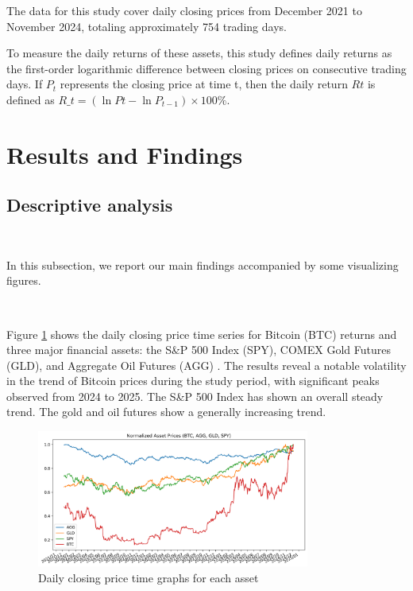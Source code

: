 \documentclass{article}
\begin{document}
The data for this study cover daily closing prices from December 2021 to November 2024, totaling approximately 754 trading days.



To measure the daily returns of these assets, this study defines daily returns as the first-order logarithmic difference between closing prices on consecutive trading days. If $P_t$  represents the closing price at time t, then the daily return $Rt$ is defined as $R\_t = (\ln Pt - \ln P_{t-1}) \times 100\%$. 

\section{Results and Findings}




\subsection{Descriptive analysis}
\

In this subsection, we report our main findings accompanied by some visualizing figures.

\

Figure \ref{prince} shows the daily closing price time series for Bitcoin (BTC) returns and three major financial assets: the S\&P 500 Index (SPY), COMEX Gold Futures (GLD), and Aggregate Oil Futures (AGG) . The results reveal a notable volatility in the trend of Bitcoin prices during the study period, with significant peaks observed from 2024 to 2025. The S\&P 500 Index has shown an overall steady trend. The gold and oil futures show a generally increasing trend.
\

\begin{figure}[h!]
    \centering
    \includegraphics[width=0.8\textwidth]{figures/normalized_asset_prices.png}
    \caption{Daily closing price time graphs for each asset}
    \label{prince}
    
\end{figure}
\end{document}
